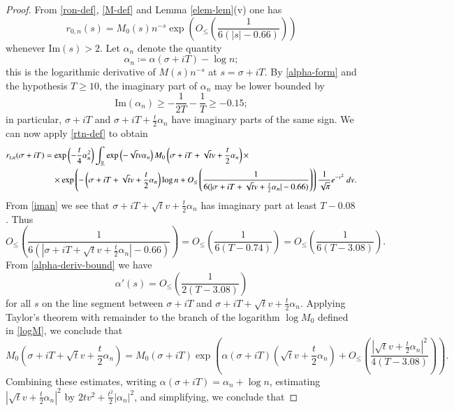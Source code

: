 \begin{proof}  From \eqref{ron-def}, \eqref{M-def} and Lemma \ref{elem-lem}(v) one has
$$ 
r_{0,n}(s) = M_0(s) n^{-s} \exp\left( O_{\leq}\left( \frac{1}{6(|s|-0.66)} \right) \right)
$$
whenever $\mathrm{Im}(s) > 2$.  Let $\alpha_n$ denote the quantity
\begin{equation}\label{alphan-def}
\alpha_n \coloneqq \alpha(\sigma+iT) - \log n;
\end{equation}
this is the logarithmic derivative of $M(s) n^{-s}$ at $s=\sigma+iT$.  
By \eqref{alpha-form} and the hypothesis $T \geq 10$, the imaginary part of $\alpha_n$ may be lower bounded by
\begin{equation}\label{iman}
 \mathrm{Im}(\alpha_n) \geq -\frac{1}{2T} - \frac{1}{T} \geq -0.15;
\end{equation}
in particular, $\sigma+iT$ and $\sigma+iT+\frac{t}{2}\alpha_n$ have imaginary parts of the same sign.
We can now apply \eqref{rtn-def} to obtain
\begin{align*}
 r_{t,n}(\sigma+iT) &= \exp\left( - \frac{t}{4} \alpha_n^2\right) \int_{\mathbb{R}} \exp\left( - \sqrt{t} v \alpha_n\right) M_0\left( \sigma + iT + \sqrt{t} v + \frac{t}{2} \alpha_n\right) \times \\
&\quad \times \exp\left( -\left(\sigma+iT+\sqrt{t} v + \frac{t}{2} \alpha_n \right) \log n + O_{\leq}\left( \frac{1}{6(|\sigma+iT+\sqrt{t} v + \frac{t}{2} \alpha_n|-0.66)} \right) \right)
\frac{1}{\sqrt{\pi}} e^{-v^2}\ dv.
\end{align*}
From \eqref{iman} we see that $\sigma+iT+\sqrt{t}v+\frac{t}{2}\alpha_n$ has imaginary part at least $T-0.08$. Thus
$$ O_{\leq}\left( \frac{1}{6(|\sigma+iT+\sqrt{t} v + \frac{t}{2} \alpha_n|-0.66)} \right)  = 
O_{\leq}\left( \frac{1}{6(T - 0.74)} \right) = O_{\leq}\left( \frac{1}{6(T - 3.08)} \right).$$
From \eqref{alpha-deriv-bound} we have
$$ \alpha'(s) = O_{\leq}\left( \frac{1}{2(T-3.08)} \right)$$
for all $s$ on the line segment between $\sigma+iT$ and $\sigma + iT + \sqrt{t} v + \frac{t}{2} \alpha_n$.  Applying Taylor's theorem with remainder to the branch of the logarithm $\log M_0$ defined in \eqref{logM}, we conclude that
$$ M_0( \sigma + iT + \sqrt{t} v + \frac{t}{2} \alpha_n) = M_0(\sigma+iT) \exp\left( \alpha(\sigma+iT) (\sqrt{t} v + \frac{t}{2} \alpha_n) + O_{\leq}\left( \frac{|\sqrt{t} v + \frac{t}{2} \alpha_n|^2}{4(T-3.08)}  \right)\right).$$
Combining these estimates, writing $\alpha(\sigma+iT) = \alpha_n + \log n$, estimating $|\sqrt{t} v + \frac{t}{2} \alpha_n|^2$ by $2tv^2 + \frac{t^2}{2} |\alpha_n|^2$, and simplifying, we conclude that

\end{proof}
